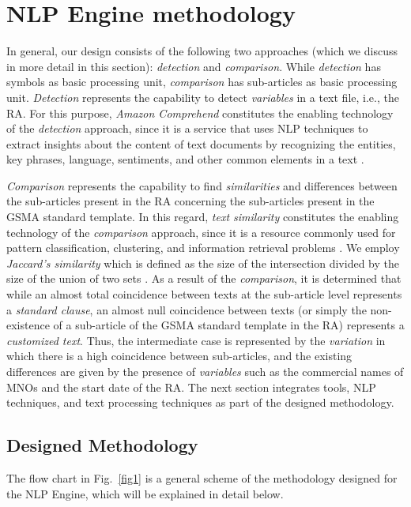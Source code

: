 \section{NLP Engine methodology}\label{methodology}
In general, our design consists of the following two approaches (which we discuss in more detail in this section): \textit{detection} and \textit{comparison}. While \textit{detection} has symbols as basic processing unit, \textit{comparison} has sub-articles as basic processing unit. \textit{Detection} represents the capability to detect \textit{variables} in a text file, i.e., the RA. For this purpose, \textit{Amazon Comprehend} constitutes the enabling technology of the \textit{detection} approach, since it is a service that uses NLP techniques to extract insights about the content of text documents by recognizing  the  entities,  key  phrases,  language,  sentiments,  and  other  common  elements  in  a  text \cite{AWS2021}.

\textit{Comparison} represents the capability to find \textit{similarities} and differences between the sub-articles present in the RA concerning the sub-articles present in the GSMA standard template. In this regard, \textit{text similarity} constitutes the enabling technology of the \textit{comparison} approach, since it is a resource commonly used for pattern classification, clustering, and information retrieval problems \cite{7429408}. We employ \textit{Jaccard's similarity} which is defined as the size of the intersection divided by the size of the union of two sets \cite{Gupta2018}. As a result of the \textit{comparison}, it is determined that while an almost total coincidence between texts at the sub-article level represents a \textit{standard clause}, an almost null coincidence between texts (or simply the non-existence of a sub-article of the GSMA standard template in the RA) represents a \textit{customized text}. Thus, the intermediate case is represented by the \textit{variation} in which there is a high coincidence between sub-articles, and the existing differences are given by the presence of \textit{variables} such as the commercial names of MNOs and the start date of the RA. The next section integrates tools, NLP techniques, and text processing techniques as part of the designed methodology.

\subsection{Designed Methodology}
The flow chart in Fig.~\ref{fig1} is a general scheme of the methodology designed for the NLP Engine, which will be explained in detail below.

